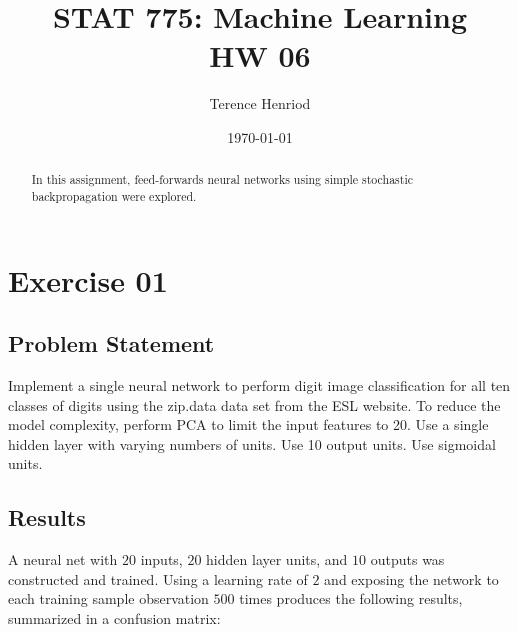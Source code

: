 \documentclass{article}
\title{STAT 775: Machine Learning \\ HW 06}
\author{Terence Henriod}
\date{\today}
\begin{document}
\clearpage            %
\maketitle            %
\thispagestyle{empty} %

\begin{abstract}
In this assignment, feed-forwards neural networks using simple stochastic backpropagation were explored.
\end{abstract}

\newpage
\section{Exercise 01}
\subsection{Problem Statement}
Implement a single neural network to perform digit image classification for all ten classes of digits using the zip.data data set from the ESL website. To reduce the model complexity, perform PCA to limit the input features to 20. Use a single hidden layer with varying numbers of units. Use 10 output units. Use sigmoidal units.

\subsection{Results}
A neural net with $20$ inputs, $20$ hidden layer units, and $10$ outputs was constructed and trained. Using a learning rate of $2$ and exposing the network to each training sample observation $500$ times produces the following results, summarized in a confusion matrix:
\end{document}

